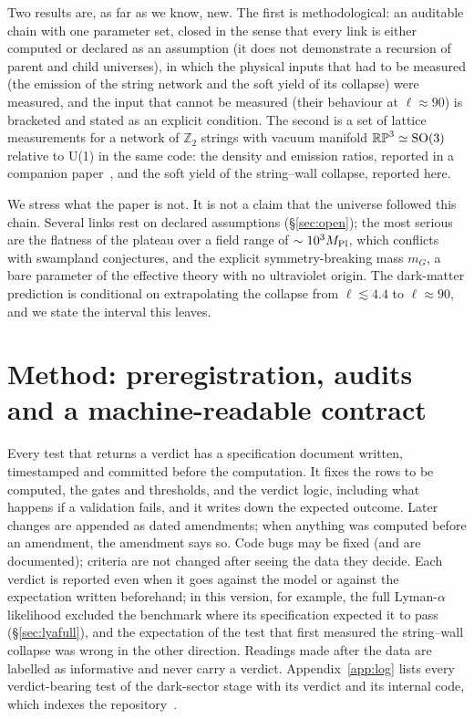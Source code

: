 \documentclass[11pt,a4paper]{article}
\newcommand{\RP}{\mathbb{RP}^3}
\newcommand{\Ztwo}{\mathbb{Z}_2}
\newcommand{\Mpl}{M_{\rm Pl}}
\begin{document}
Two results are, as far as we know, new.
The first is methodological: an auditable chain with one parameter set, closed in the sense that every link is either computed or declared as an assumption (it does not demonstrate a recursion of parent and child universes), in which the physical inputs that had to be measured (the emission of the string network and the soft yield of its collapse) were measured, and the input that cannot be measured (their behaviour at $\ell\approx90$) is bracketed and stated as an explicit condition.
The second is a set of lattice measurements for a network of $\Ztwo$ strings with vacuum manifold $\RP\simeq{\rm SO}(3)$ relative to U(1) in the same code: the density and emission ratios, reported in a companion paper~\cite{rp3_paper}, and the soft yield of the string--wall collapse, reported here.

We stress what the paper is not.
It is not a claim that the universe followed this chain.
Several links rest on declared assumptions (\S\ref{sec:open}); the most serious are the flatness of the plateau over a field range of $\sim10^3\Mpl$, which conflicts with swampland conjectures, and the explicit symmetry-breaking mass $m_G$, a bare parameter of the effective theory with no ultraviolet origin.
The dark-matter prediction is conditional on extrapolating the collapse from $\ell\lesssim4.4$ to $\ell\approx90$, and we state the interval this leaves.

\section{Method: preregistration, audits and a machine-readable contract}
\label{sec:method}

Every test that returns a verdict has a specification document written, timestamped and committed before the computation.
It fixes the rows to be computed, the gates and thresholds, and the verdict logic, including what happens if a validation fails, and it writes down the expected outcome.
Later changes are appended as dated amendments; when anything was computed before an amendment, the amendment says so.
Code bugs may be fixed (and are documented); criteria are not changed after seeing the data they decide.
Each verdict is reported even when it goes against the model or against the expectation written beforehand; in this version, for example, the full Lyman-$\alpha$ likelihood excluded the benchmark where its specification expected it to pass (\S\ref{sec:lyafull}), and the expectation of the test that first measured the string--wall collapse was wrong in the other direction.
Readings made after the data are labelled as informative and never carry a verdict.
Appendix~\ref{app:log} lists every verdict-bearing test of the dark-sector stage with its verdict and its internal code, which indexes the repository~\cite{whalefall_chain}.
\end{document}
